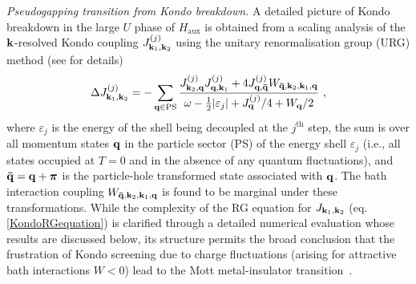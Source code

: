 \documentclass[%
 reprint,
superscriptaddress,
groupedaddress,
 amsmath,amssymb,
 aps,
prl,superscriptaddress
]{revtex4-2}
\begin{document}
\par\noindent\textit{Pseudogapping transition from Kondo breakdown.} A detailed picture of Kondo breakdown in the large $U$ phase of $H_\text{aux}$ is obtained from a scaling analysis of the ${\bf k}$-resolved Kondo coupling \(J^{(j)}_{{\bf k}_1, {\bf k}_2}\) using the 
unitary renormalisation group (URG) method \cite{anirbanurg1} (see \cite{suppmat} for details)
\begin{equation}\begin{aligned}\label{KondoRGequation}
	\Delta J^{(j)}_{{\bf k}_1, {\bf k}_2} = -\sum_{{\bf q} \in \text{PS}} \frac{J^{(j)}_{{\bf k}_2,{\bf q}} J^{(j)}_{{\bf q},{\bf k}_1} + 4J^{(j)}_{{\bf q}, {\bf \bar q}} W_{{\bf \bar q}, {\bf k}_2, {\bf k}_1, {\bf q}}}{\omega - \frac{1}{2}|\varepsilon_j| + J^{(j)}_{{\bf q}}/4 + W_{{\bf q}}/2}~,
\end{aligned}\end{equation}
where \(\varepsilon_j\) is the energy of the shell being decoupled at the \(j^\text{th}\) step, the sum is over all momentum states \({\bf q}\) in the particle sector (PS) of the energy shell \(\varepsilon_j\) (i.e., all states occupied at \(T=0\) and in the absence of any quantum fluctuations), and  \({\bf \bar q} = {\bf q} + {\boldsymbol \pi}\) is the particle-hole transformed state associated with ${\bf q}$. The bath interaction coupling $W_{{\bf \bar q}, {\bf k}_2, {\bf k}_1, {\bf q}}$ is found to be marginal under these transformations. While the complexity of the RG equation for $J_{{\bf k}_1, {\bf k}_2}$ (eq.\eqref{KondoRGequation}) is clarified through a detailed numerical evaluation whose results are discussed below, its structure permits the broad conclusion that the frustration of Kondo screening due to charge fluctuations (arising for attractive bath interactions $W<0$) lead to the Mott metal-insulator transition~\cite{Mukherjee_2023}.
\end{document}
